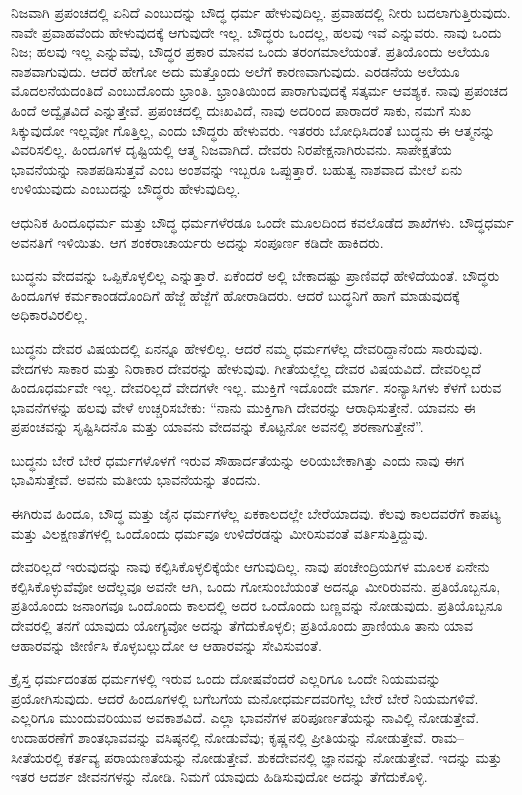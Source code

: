 ನಿಜವಾಗಿ ಪ್ರಪಂಚದಲ್ಲಿ ಏನಿದೆ ಎಂಬುದನ್ನು ಬೌದ್ಧ ಧರ್ಮ ಹೇಳುವುದಿಲ್ಲ. ಪ್ರವಾಹದಲ್ಲಿ ನೀರು ಬದಲಾಗುತ್ತಿರುವುದು. ನಾವೇ ಪ್ರವಾಹವೆಂದು ಹೇಳುವುದಕ್ಕೆ ಆಗುವುದೇ ಇಲ್ಲ. ಬೌದ್ಧರು ಒಂದಲ್ಲ, ಹಲವು ಇವೆ ಎನ್ನುವರು. ನಾವು ಒಂದು ನಿಜ; ಹಲವು ಇಲ್ಲ ಎನ್ನುವೆವು, ಬೌದ್ಧರ ಪ್ರಕಾರ ಮಾನವ ಒಂದು ತರಂಗಮಾಲೆಯಂತೆ. ಪ್ರತಿಯೊಂದು ಅಲೆಯೂ ನಾಶವಾಗುವುದು. ಆದರೆ ಹೇಗೋ ಅದು ಮತ್ತೊಂದು ಅಲೆಗೆ ಕಾರಣವಾಗುವುದು. ಎರಡನೆಯ ಅಲೆಯೂ ಮೊದಲನೆಯದಂತಿದೆ ಎಂಬುದೊಂದು ಭ್ರಾಂತಿ. ಭ್ರಾಂತಿಯಿಂದ ಪಾರಾಗುವುದಕ್ಕೆ ಸತ್ಕರ್ಮ ಆವಶ್ಯಕ. ನಾವು ಪ್ರಪಂಚದ ಹಿಂದೆ ಅದ್ವೈತವಿದೆ ಎನ್ನುತ್ತೇವೆ. ಪ್ರಪಂಚದಲ್ಲಿ ದುಃಖವಿದೆ, ನಾವು ಅದರಿಂದ ಪಾರಾದರೆ ಸಾಕು, ನಮಗೆ ಸುಖ ಸಿಕ್ಕುವುದೋ ಇಲ್ಲವೋ ಗೊತ್ತಿಲ್ಲ, ಎಂದು ಬೌದ್ಧರು ಹೇಳುವರು. ಇತರರು ಬೋಧಿಸಿದಂತೆ ಬುದ್ಧನು ಈ ಆತ್ಮನನ್ನು ವಿವರಿಸಲಿಲ್ಲ. ಹಿಂದೂಗಳ ದೃಷ್ಟಿಯಲ್ಲಿ ಆತ್ಮ ನಿಜವಾಗಿದೆ. ದೇವರು ನಿರಪೇಕ್ಷನಾಗಿರುವನು. ಸಾಪೇಕ್ಷತೆಯ ಭಾವನೆಯನ್ನು ನಾಶಪಡಿಸುತ್ತವೆ ಎಂಬ ಅಂಶವನ್ನು ಇಬ್ಬರೂ ಒಪ್ಪುತ್ತಾರೆ. ಬಹುತ್ವ ನಾಶವಾದ ಮೇಲೆ ಏನು ಉಳಿಯುವುದು ಎಂಬುದನ್ನು ಬೌದ್ಧರು ಹೇಳುವುದಿಲ್ಲ.

ಆಧುನಿಕ ಹಿಂದೂಧರ್ಮ ಮತ್ತು ಬೌದ್ಧ ಧರ್ಮಗಳೆರಡೂ ಒಂದೇ ಮೂಲದಿಂದ ಕವಲೊಡೆದ ಶಾಖೆಗಳು. ಬೌದ್ಧಧರ್ಮ ಅವನತಿಗೆ ಇಳಿಯಿತು. ಆಗ ಶಂಕರಾಚಾರ್ಯರು ಅದನ್ನು ಸಂಪೂರ್ಣ ಕಡಿದೇ ಹಾಕಿದರು.

ಬುದ್ಧನು ವೇದವನ್ನು ಒಪ್ಪಿಕೊಳ್ಳಲಿಲ್ಲ ಎನ್ನುತ್ತಾರೆ. ಏಕೆಂದರೆ ಅಲ್ಲಿ ಬೇಕಾದಷ್ಟು ಪ್ರಾಣಿವಧೆ ಹೇಳಿದೆಯಂತೆ. ಬೌದ್ಧರು ಹಿಂದೂಗಳ ಕರ್ಮಕಾಂಡದೊಂದಿಗೆ ಹೆಜ್ಜೆ ಹೆಜ್ಜೆಗೆ ಹೋರಾಡಿದರು. ಆದರೆ ಬುದ್ಧನಿಗೆ ಹಾಗೆ ಮಾಡುವುದಕ್ಕೆ ಅಧಿಕಾರವಿರಲಿಲ್ಲ.

ಬುದ್ಧನು ದೇವರ ವಿಷಯದಲ್ಲಿ ಏನನ್ನೂ ಹೇಳಲಿಲ್ಲ. ಆದರೆ ನಮ್ಮ ಧರ್ಮಗಳೆಲ್ಲ ದೇವರಿದ್ದಾನೆಂದು ಸಾರುವುವು. ವೇದಗಳು ಸಾಕಾರ ಮತ್ತು ನಿರಾಕಾರ ದೇವರನ್ನು ಹೇಳುವುವು. ಗೀತೆಯಲ್ಲೆಲ್ಲ ದೇವರ ವಿಷಯವಿದೆ. ದೇವರಿಲ್ಲದೆ ಹಿಂದೂಧರ್ಮವೇ ಇಲ್ಲ. ದೇವರಿಲ್ಲದೆ ವೇದಗಳೇ ಇಲ್ಲ. ಮುಕ್ತಿಗೆ ಇದೊಂದೇ ಮಾರ್ಗ. ಸಂನ್ಯಾಸಿಗಳು ಕೆಳಗೆ ಬರುವ ಭಾವನೆಗಳನ್ನು ಹಲವು ವೇಳೆ ಉಚ್ಚರಿಸಬೇಕು: “ನಾನು ಮುಕ್ತಿಗಾಗಿ ದೇವರನ್ನು ಆರಾಧಿಸುತ್ತೇನೆ. ಯಾವನು ಈ ಪ್ರಪಂಚವನ್ನು ಸೃಷ್ಟಿಸಿದನೊ ಮತ್ತು ಯಾವನು ವೇದವನ್ನು ಕೊಟ್ಟನೋ ಅವನಲ್ಲಿ ಶರಣಾಗುತ್ತೇನೆ”.

ಬುದ್ಧನು ಬೇರೆ ಬೇರೆ ಧರ್ಮಗಳೊಳಗೆ ಇರುವ ಸೌಹಾರ್ದತೆಯನ್ನು ಅರಿಯಬೇಕಾಗಿತ್ತು ಎಂದು ನಾವು ಈಗ ಭಾವಿಸುತ್ತೇವೆ. ಅವನು ಮತೀಯ ಭಾವನೆಯನ್ನು ತಂದನು.

ಈಗಿರುವ ಹಿಂದೂ, ಬೌದ್ಧ ಮತ್ತು ಜೈನ ಧರ್ಮಗಳೆಲ್ಲ ಏಕಕಾಲದಲ್ಲೇ ಬೇರೆಯಾದವು. ಕೆಲವು ಕಾಲದವರೆಗೆ ಕಾಪಟ್ಯ ಮತ್ತು ವಿಲಕ್ಷಣತೆಗಳಲ್ಲಿ ಒಂದೊಂದು ಧರ್ಮವೂ ಉಳಿದೆರಡನ್ನು ಮೀರಿಸುವಂತೆ ವರ್ತಿಸುತ್ತಿದ್ದುವು.

ದೇವರಿಲ್ಲದೆ ಇರುವುದನ್ನು ನಾವು ಕಲ್ಪಿಸಿಕೊಳ್ಳಲಿಕ್ಕೆಯೇ ಆಗುವುದಿಲ್ಲ. ನಾವು ಪಂಚೇಂದ್ರಿಯಗಳ ಮೂಲಕ ಏನೇನು ಕಲ್ಪಿಸಿಕೊಳ್ಳುವೆವೋ ಅದೆಲ್ಲವೂ ಅವನೇ ಆಗಿ, ಒಂದು ಗೋಸುಂಬೆಯಂತೆ ಅದನ್ನೂ ಮೀರಿರುವನು. ಪ್ರತಿಯೊಬ್ಬನೂ, ಪ್ರತಿಯೊಂದು ಜನಾಂಗವೂ ಒಂದೊಂದು ಕಾಲದಲ್ಲಿ ಅದರ ಒಂದೊಂದು ಬಣ್ಣವನ್ನು ನೋಡುವುದು. ಪ್ರತಿಯೊಬ್ಬನೂ ದೇವರಲ್ಲಿ ತನಗೆ ಯಾವುದು ಯೋಗ್ಯವೋ ಅದನ್ನು ತೆಗೆದುಕೊಳ್ಳಲಿ; ಪ್ರತಿಯೊಂದು ಪ್ರಾಣಿಯೂ ತಾನು ಯಾವ ಆಹಾರವನ್ನು ಜೀರ್ಣಿಸಿ ಕೊಳ್ಳಬಲ್ಲುದೋ ಆ ಆಹಾರವನ್ನು ಸೇವಿಸುವಂತೆ.

ಕ್ರೈಸ್ತ ಧರ್ಮದಂತಹ ಧರ್ಮಗಳಲ್ಲಿ ಇರುವ ಒಂದು ದೋಷವೆಂದರೆ ಎಲ್ಲರಿಗೂ ಒಂದೇ ನಿಯಮವನ್ನು ಪ್ರಯೋಗಿಸುವುದು. ಆದರೆ ಹಿಂದೂಗಳಲ್ಲಿ ಬಗೆಬಗೆಯ ಮನೋಧರ್ಮದವರಿಗೆಲ್ಲ ಬೇರೆ ಬೇರೆ ನಿಯಮಗಳಿವೆ. ಎಲ್ಲರಿಗೂ ಮುಂದುವರಿಯುವ ಅವಕಾಶವಿದೆ. ಎಲ್ಲಾ ಭಾವನೆಗಳ ಪರಿಪೂರ್ಣತೆಯನ್ನು ನಾವಿಲ್ಲಿ ನೋಡುತ್ತೇವೆ. ಉದಾಹರಣೆಗೆ ಶಾಂತಭಾವವನ್ನು ವಸಿಷ್ಠನಲ್ಲಿ ನೋಡುವೆವು; ಕೃಷ್ಣನಲ್ಲಿ ಪ್ರೀತಿಯನ್ನು ನೋಡುತ್ತೇವೆ. ರಾಮ–ಸೀತೆಯರಲ್ಲಿ ಕರ್ತವ್ಯ ಪರಾಯಣತೆಯನ್ನು ನೋಡುತ್ತೇವೆ. ಶುಕದೇವನಲ್ಲಿ ಜ್ಞಾನವನ್ನು ನೋಡುತ್ತೇವೆ. ಇದನ್ನು ಮತ್ತು ಇತರ ಆದರ್ಶ ಜೀವನಗಳನ್ನು ನೋಡಿ. ನಿಮಗೆ ಯಾವುದು ಹಿಡಿಸುವುದೋ ಅದನ್ನು ತೆಗೆದುಕೊಳ್ಳಿ.

